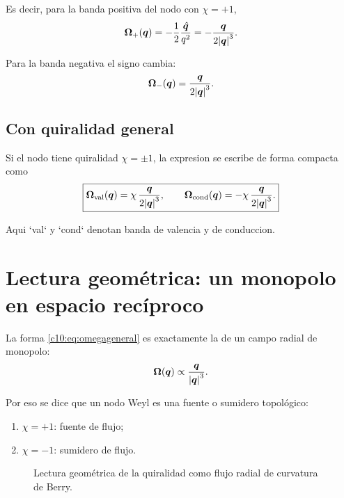 Es decir, para la banda positiva del nodo con \(\chi=+1\),
\begin{equation}
\bm{\Omega}_+(\bm{q})
=
-\frac{1}{2}\frac{\hat{\bm{q}}}{q^2}
=
-\frac{\bm{q}}{2\abs{\bm{q}}^3}.
\label{c10:eq:omega-plus}
\end{equation}

Para la banda negativa el signo cambia:
\begin{equation}
\bm{\Omega}_-(\bm{q})
=
\frac{\bm{q}}{2\abs{\bm{q}}^3}.
\label{c10:eq:omega-minus}
\end{equation}

\subsection{Con quiralidad general}
Si el nodo tiene quiralidad \(\chi=\pm 1\), la expresion se escribe de forma compacta como
\begin{equation}
\boxed{
\bm{\Omega}_{\text{val}}(\bm{q})
=
\chi\,\frac{\bm{q}}{2\abs{\bm{q}}^3},
\qquad
\bm{\Omega}_{\text{cond}}(\bm{q})
=
-\chi\,\frac{\bm{q}}{2\abs{\bm{q}}^3}.
}
\label{c10:eq:omegageneral}
\end{equation}

Aqui `val` y `cond` denotan banda de valencia y de conduccion.

\section{Lectura geométrica: un monopolo en espacio recíproco}
La forma \eqref{c10:eq:omegageneral} es exactamente la de un campo radial de monopolo:
\begin{equation}
\bm{\Omega}(\bm{q}) \propto \frac{\bm{q}}{\abs{\bm{q}}^3}.
\end{equation}

Por eso se dice que un nodo Weyl es una fuente o sumidero topológico:
\begin{enumerate}[label=\arabic*.]
    \item \(\chi=+1\): fuente de flujo;
    \item \(\chi=-1\): sumidero de flujo.
\end{enumerate}

\begin{figure}[h!]
\centering
{}
\caption{Lectura geométrica de la quiralidad como flujo radial de curvatura de Berry.}
\end{figure}

